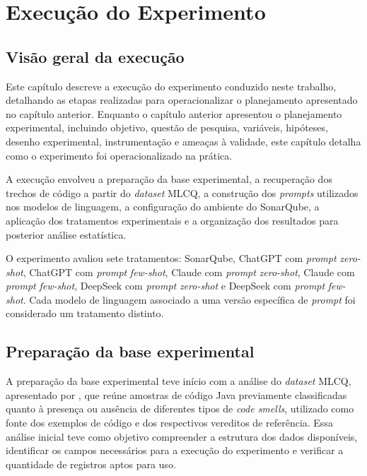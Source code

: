 \chapter[Execução do Experimento]{Execução do Experimento}

\section{Visão geral da execução}

Este capítulo descreve a execução do experimento conduzido neste trabalho, detalhando as etapas realizadas para operacionalizar 
o planejamento apresentado no capítulo anterior. Enquanto o capítulo anterior apresentou o planejamento experimental, 
incluindo objetivo, questão de pesquisa, variáveis, hipóteses, desenho experimental, instrumentação e ameaças à validade, 
este capítulo detalha como o experimento foi operacionalizado na prática.

A execução envolveu a preparação da base experimental, a recuperação dos trechos de código a partir do \textit{dataset} MLCQ, 
a construção dos \textit{prompts} utilizados nos modelos de linguagem, a configuração do ambiente do SonarQube, a 
aplicação dos tratamentos experimentais e a organização dos resultados para posterior análise estatística.

O experimento avaliou sete tratamentos: SonarQube, ChatGPT com \textit{prompt} \textit{zero-shot}, ChatGPT com \textit{prompt} \textit{few-shot}, Claude com \textit{prompt} \textit{zero-shot}, 
Claude com \textit{prompt} \textit{few-shot}, DeepSeek com \textit{prompt} \textit{zero-shot} e DeepSeek com \textit{prompt} \textit{few-shot}. Cada modelo de linguagem associado a uma versão 
específica de \textit{prompt} foi considerado um tratamento distinto.


\section{Preparação da base experimental}

A preparação da base experimental teve início com a análise do \textit{dataset} MLCQ, apresentado por , que reúne amostras de código Java previamente 
classificadas quanto à presença ou ausência de diferentes tipos de \textit{code smells}, utilizado como fonte dos exemplos de código e dos respectivos vereditos de referência. 
Essa análise inicial teve como objetivo compreender a estrutura dos dados disponíveis, identificar os campos necessários para 
a execução do experimento e verificar a quantidade de registros aptos para uso. 

